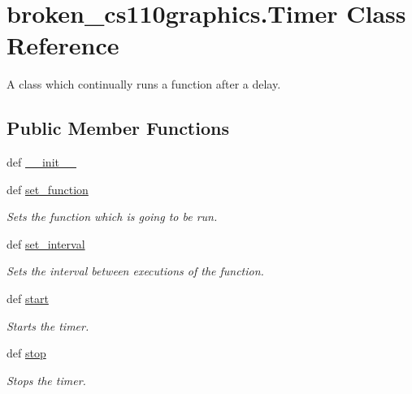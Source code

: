 \hypertarget{classbroken__cs110graphics_1_1Timer}{
\section{broken\_\-cs110graphics.Timer Class Reference}
\label{classbroken__cs110graphics_1_1Timer}
}


A class which continually runs a function after a delay.  
\subsection*{Public Member Functions}
\begin{DoxyCompactItemize}
\item 
def \hyperlink{classbroken__cs110graphics_1_1Timer_aea9f1934a4aca0892291967e330fc4c0}{\_\-\_\-init\_\-\_\-}
\item 
def \hyperlink{classbroken__cs110graphics_1_1Timer_ab3b47919b430fbaf407f025f13306ce5}{set\_\-function}
\begin{DoxyCompactList}\small\item\em Sets the function which is going to be run. \item\end{DoxyCompactList}\item 
def \hyperlink{classbroken__cs110graphics_1_1Timer_a51bf31ff89789b8d58cda32fadaafc42}{set\_\-interval}
\begin{DoxyCompactList}\small\item\em Sets the interval between executions of the function. \item\end{DoxyCompactList}\item 
def \hyperlink{classbroken__cs110graphics_1_1Timer_a52d4c189cd76c43481ac173291b960bd}{start}
\begin{DoxyCompactList}\small\item\em Starts the timer. \item\end{DoxyCompactList}\item 
def \hyperlink{classbroken__cs110graphics_1_1Timer_a4dd29b6f9ef5579d86e57e64f5709538}{stop}
\begin{DoxyCompactList}\small\item\em Stops the timer. \item\end{DoxyCompactList}\end{DoxyCompactItemize}


